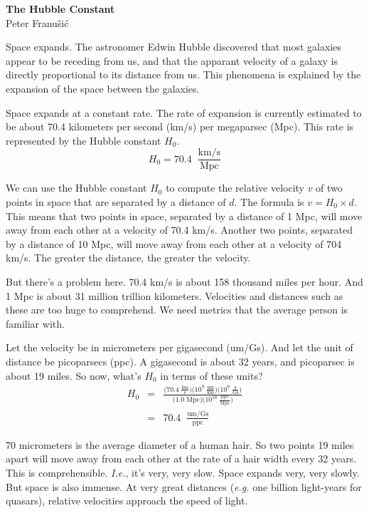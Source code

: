 \documentclass{report}
\newcommand{\xu}[1]{\;\mathrm{\scriptstyle{#1}}}
\newcommand{\xw}[2]{\;\textstyle{\frac{\mathrm{#1}}{\mathrm{#2}}}}
\begin{document}
\begin{center}
\textbf{\Huge The Hubble Constant} \\
\vspace{2ex}
\textrm{\Large Peter Franu\v si\'c} \\
\end{center}
\vspace{0.5in}

Space expands.
The astronomer Edwin Hubble discovered that most galaxies appear to be receding from us,
and that the apparant velocity of a galaxy is directly proportional to its distance from us.
This phenomena is explained by the expansion of the space between the galaxies.

Space expands at a constant rate.
The rate of expansion is currently estimated to be about 
70.4 kilometers per second (km/s) per megaparsec (Mpc).
This rate is represented by the Hubble constant $H_0$.
\begin{equation*}
  H_0 = 70.4 \; \xw{km/s}{Mpc}
\end{equation*}

We can use the Hubble constant $H_0$ to compute the relative velocity $v$ 
of two points in space that are separated by a distance of $d$.
The formula is $  v = H_0 \times d$.
This means that two points in space, separated by a distance of 1 Mpc,
will move away from each other at a velocity of 70.4 km/s.
Another two points, separated by a distance of 10 Mpc,
will move away from each other at a velocity of 704 km/s.
The greater the distance, the greater the velocity.

But there's a problem here.
70.4 km/s is about 158 thousand miles per hour.
And 1 Mpc is about 31 million trillion kilometers.
Velocities and distances such as these are too huge to comprehend.
We need metrics that the average person is familiar with.

Let the velocity be in micrometers per gigasecond (um/Gs).
And let the unit of distance be picoparsecs (ppc).
A gigasecond is about 32 years, and picoparsec is about 19 miles.
So now, what's $H_0$ in terms of these units?
\begin{eqnarray*}
  H_0 &=& \frac{\Big( 70.4 \xw{km}{s}  \Big)
                \Big( 10^9 \xw{um}{km} \Big)
                \Big( 10^9 \xw{s}{Gs}  \Big)}
               {\Big( 1.0 \xu{Mpc}  \Big)
		\Big( 10^{18} \xw{ppc}{Mpc} \Big)} \\
      &=& 70.4 \; \xw{um/Gs}{ppc}
\end{eqnarray*}

70 micrometers is the average diameter of a human hair.
So two points 19 miles apart will move away from each other
at the rate of a hair width every 32 years.
This is comprehensible.  \emph{I.e.}, it's very, very slow.
Space expands very, very slowly.  But space is also immense.
At very great distances (\emph{e.g.} one billion light-years for quasars),
relative velocities approach the speed of light.
\end{document}
